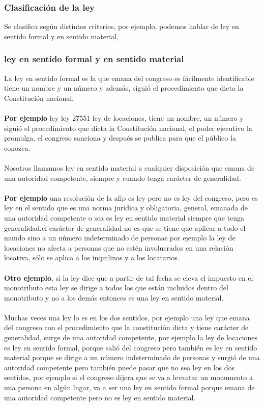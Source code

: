 \documentclass[12pt]{book}
\begin{document}
\subsubsection{Clasificación de la ley}Se clasifica según distintos criterios, por ejemplo, podemos hablar de ley en sentido formal y en sentido material,
\subsubsection{ley en sentido formal y en sentido material}
La ley en sentido formal es la que emana del congreso es fácilmente identificable tiene un nombre y un número y además, siguió el procedimiento que dicta la Constitución nacional.
\\
\\
\textbf{Por ejemplo} ley ley 27551 ley de locaciones, tiene un nombre, un número y siguió el procedimiento que dicta la Constitución nacional, el poder ejecutivo la promulga, el congreso sanciona y después se publica para que el público la conozca.
\\
\\
Nosotros llamamos ley en sentido material a cualquier disposición que emana de una autoridad competente, siempre y cuando tenga carácter de generalidad.
\\
\\
\textbf{Por ejemplo} una resolución de la afip es ley pero no es ley del congreso, pero es ley en el sentido que es una norma jurídica  y obligatoria, general, emanada de una autoridad competente o sea es ley en sentido material siempre que tenga generalidad,el carácter de generalidad no es que se tiene que aplicar a todo el mundo sino a un número indeterminado de personas por ejemplo la ley de locaciones no afecta a personas que no estén involucrados en una relación locativa, sólo se aplica a los inquilinos y a los locatarios.
\\
\\
\textbf{Otro ejemplo}, si la ley dice que a partir de tal fecha se eleva el impuesto en el monotributo esta ley se dirige a todos los que están incluidos dentro del monotributo y no a los demás entonces es una ley en sentido material.
\\
\\
Muchas veces una ley lo es en los dos sentidos, por ejemplo una ley que emana del congreso con el procedimiento que la constitución dicta y tiene carácter de generalidad, surge de una autoridad competente, por ejemplo la ley de locaciones es ley en sentido formal, porque salió del congreso pero también es ley en sentido material porque se dirige a un número indeterminado de personas y surgió de una autoridad competente pero también puede pasar que no sea ley en los dos sentidos, por ejemplo si el congreso dijera que se va a levantar un monumento a una persona en algún lugar, va a ser una ley en sentido formal porque emana de una autoridad competente pero no es ley en sentido material.
\end{document}
